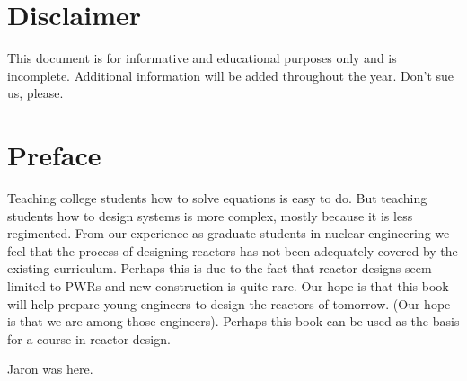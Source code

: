 \documentclass[]{article}
\begin{document}
\section{Disclaimer}
This document is for informative and educational purposes only and is incomplete.  Additional information will be added throughout the year. Don't sue us, please.

\section{Preface}
Teaching college students how to solve equations is easy to do. But teaching students how to design systems is more complex, mostly because it is less regimented. From our experience as graduate students in nuclear engineering we feel that the process of designing reactors has not been adequately covered by the existing curriculum. Perhaps this is due to the fact that reactor designs seem limited to PWRs and new construction is quite rare. Our hope is that this book will help prepare young engineers to design the reactors of tomorrow. (Our hope is that we are among those engineers). Perhaps this book can be used as the basis for a course in reactor design.

Jaron was here.
\end{document}
